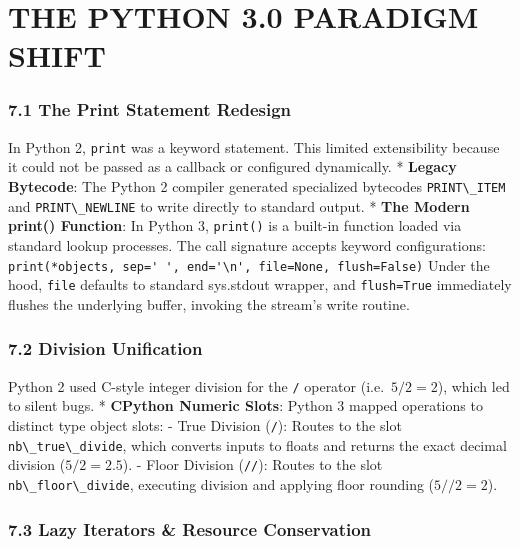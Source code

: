 \hypertarget{the-python-3.0-paradigm-shift}{%
\chapter{THE PYTHON 3.0 PARADIGM
SHIFT}\label{the-python-3.0-paradigm-shift}}

\hypertarget{the-print-statement-redesign}{%
\subsection{7.1 The Print Statement
Redesign}\label{the-print-statement-redesign}}

In Python 2, \passthrough{\lstinline!print!} was a keyword statement.
This limited extensibility because it could not be passed as a callback
or configured dynamically. * \textbf{Legacy Bytecode}: The Python 2
compiler generated specialized bytecodes
\passthrough{\lstinline!PRINT\_ITEM!} and
\passthrough{\lstinline!PRINT\_NEWLINE!} to write directly to standard
output. * \textbf{The Modern print() Function}: In Python 3,
\passthrough{\lstinline!print()!} is a built-in function loaded via
standard lookup processes. The call signature accepts keyword
configurations:
\passthrough{\lstinline!print(*objects, sep=' ', end='\\n', file=None, flush=False)!}
Under the hood, \passthrough{\lstinline!file!} defaults to standard
sys.stdout wrapper, and \passthrough{\lstinline!flush=True!} immediately
flushes the underlying buffer, invoking the stream's write routine.

\hypertarget{division-unification}{%
\subsection{7.2 Division Unification}\label{division-unification}}

Python 2 used C-style integer division for the
\passthrough{\lstinline!/!} operator (i.e.~\(5 / 2 = 2\)), which led to
silent bugs. * \textbf{CPython Numeric Slots}: Python 3 mapped
operations to distinct type object slots: - True Division
(\passthrough{\lstinline!/!}): Routes to the slot
\passthrough{\lstinline!nb\_true\_divide!}, which converts inputs to
floats and returns the exact decimal division (\(5 / 2 = 2.5\)). - Floor
Division (\passthrough{\lstinline!//!}): Routes to the slot
\passthrough{\lstinline!nb\_floor\_divide!}, executing division and
applying floor rounding (\(5 // 2 = 2\)).

\hypertarget{lazy-iterators-resource-conservation}{%
\subsection{7.3 Lazy Iterators \& Resource
Conservation}\label{lazy-iterators-resource-conservation}}


